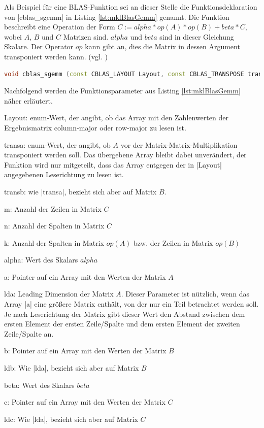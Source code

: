 \documentclass[../main.tex]{subfiles}
\begin{document}
Als Beispiel für eine BLAS-Funktion sei an dieser Stelle die Funktionsdeklaration von |cblas_sgemm| in Listing \ref{lst:mklBlasGemm} genannt. Die Funktion beschreibt eine Operation der Form \(C := alpha*op(A)*op(B) + beta*C\), wobei \(A\), \(B\) und \(C\) Matrizen sind. \(alpha\) und \(beta\) sind in dieser Gleichung Skalare. Der Operator \(op\) kann gibt an, dies die Matrix in dessen Argument transponiert werden kann. (vgl. \cite{MKLdevReference})
\begin{lstlisting}[language=c++, caption={Deklaration einer BLAS-Funktion zur Matrix-Matrix-Multiplikation(Quelle: \parencite{MKLdevReference})}, captionpos=b, label=lst:mklBlasGemm, frame=single, linewidth=\textwidth, breaklines=true]
void cblas_sgemm (const CBLAS_LAYOUT Layout, const CBLAS_TRANSPOSE transa, const CBLAS_TRANSPOSE transb, const MKL_INT m, const MKL_INT n, const MKL_INT k, const float alpha, const float *a, const MKL_INT lda, const float *b, const MKL_INT ldb, const float beta, float *c, const MKL_INT ldc);
\end{lstlisting}
Nachfolgend werden die Funktionsparameter aus Listing \ref{lst:mklBlasGemm} näher erläutert. 
\begin{description}
\item{Layout:} enum-Wert, der angibt, ob das Array mit den Zahlenwerten der Ergebnismatrix column-major oder row-major zu lesen ist. 
\item{transa: } enum-Wert, der angibt, ob \(A\) vor der Matrix-Matrix-Multiplikation transponiert werden soll. Das übergebene Array bleibt dabei unverändert, der Funktion wird nur mitgeteilt, dass das Array entgegen der in |Layout| angegebenen Leserichtung zu lesen ist. 
\item{transb: } wie |transa|, bezieht sich aber auf Matrix \(B\). 
\item{m: } Anzahl der Zeilen in Matrix \(C\)
\item{n: } Anzahl der Spalten in Matrix \(C\)
\item{k: } Anzahl der Spalten in Matrix \(op(A)\) bzw. der Zeilen in Matrix \(op(B)\)
\item{alpha: } Wert des Skalars \(alpha\)
\item{a: } Pointer auf ein Array mit den Werten der Matrix \(A\)
\item{lda: } Leading Dimension der Matrix \(A\). Dieser Parameter ist nützlich, wenn das Array |a| eine größere Matrix enthält, von der nur ein Teil betrachtet werden soll. Je nach Leserichtung der Matrix gibt dieser Wert den Abstand zwischen dem ersten Element der ersten Zeile/Spalte und dem ersten Element der zweiten Zeile/Spalte an. 
\item{b: } Pointer auf ein Array mit den Werten der Matrix \(B\)
\item{ldb: } Wie |lda|, bezieht sich aber auf Matrix \(B\)
\item{beta: } Wert des Skalars \(beta\)
\item{c: } Pointer auf ein Array mit den Werten der Matrix \(C\)
\item{ldc: } Wie |lda|, bezieht sich aber auf Matrix \(C\)
\end{description}
\end{document}
